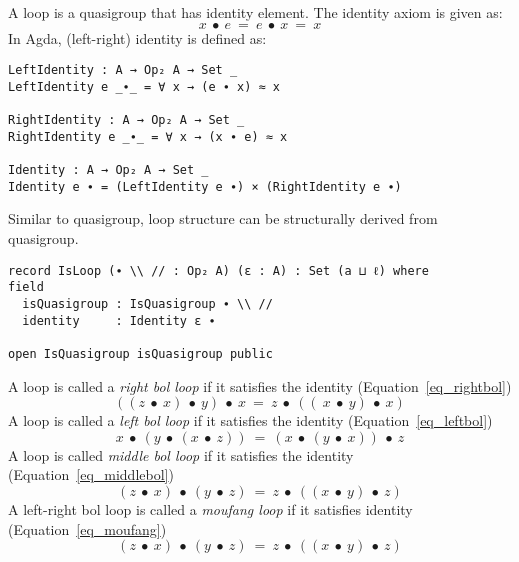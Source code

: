 A loop is a quasigroup that has identity element. The identity axiom is given
as:
\begin{equation}\label{eq_lineslope}
x\ ∙\ e\ =\ e\ ∙\ x\ =\ x
\end{equation}
In Agda, (left-right) identity is defined as:

\begin{verbatim}
LeftIdentity : A → Op₂ A → Set _
LeftIdentity e _∙_ = ∀ x → (e ∙ x) ≈ x

RightIdentity : A → Op₂ A → Set _
RightIdentity e _∙_ = ∀ x → (x ∙ e) ≈ x

Identity : A → Op₂ A → Set _
Identity e ∙ = (LeftIdentity e ∙) × (RightIdentity e ∙)
\end{verbatim}

Similar to quasigroup, loop structure can be structurally derived from
quasigroup.

\begin{verbatim}
record IsLoop (∙ \\ // : Op₂ A) (ε : A) : Set (a ⊔ ℓ) where
field
  isQuasigroup : IsQuasigroup ∙ \\ //
  identity     : Identity ε ∙

open IsQuasigroup isQuasigroup public
\end{verbatim}
A loop is called a \textit{right bol loop} if it satisfies the identity
(Equation~\ref{eq_rightbol})
\begin{equation}\label{eq_rightbol}
 ((z\ ∙\ x)\ ∙\ y)\ ∙\ x\ =\ z\ ∙\ ((\ x\ ∙\ y)\ ∙\ x)
\end{equation}
A loop is called a \textit{left bol loop} if it satisfies the identity
(Equation~\ref{eq_leftbol})
\begin{equation}\label{eq_leftbol}
 x\ ∙\ (y\ ∙\ (x\ ∙\ z))\ =\ (x\ ∙\ (y\ ∙\ x))\ ∙\ z
\end{equation}
A loop is called \textit{middle bol loop} if it satisfies the identity
(Equation~\ref{eq_middlebol}) 
\begin{equation}\label{eq_middlebol}
(z\ ∙\ x)\ ∙\ (y\ ∙\ z)\ =\ z\ ∙\ ((x\ ∙\ y)\ ∙\ z)
\end{equation}
A left-right bol loop is called a \textit{moufang loop} if it satisfies identity
(Equation~\ref{eq_moufang})
\begin{equation}\label{eq_moufang}
(z\ ∙\ x)\ ∙\ (y\ ∙\ z)\ =\ z\ ∙\ ((x\ ∙\ y)\ ∙\ z)
\end{equation} 

